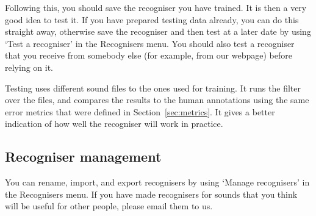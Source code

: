 \documentclass{article}
\begin{document}
Following this, you should save the recogniser you have trained. It is then a very good idea to test it. If you have prepared testing data already, you can do this straight away, otherwise save the recogniser and then test at a later date by using `Test a recogniser' in the Recognisers menu. You should also test a recogniser that you receive from somebody else (for example, from our webpage) before relying on it.

Testing uses different sound files to the ones used for training. It runs the filter over the files, and compares the results to the human annotations using the same error metrics that were defined in Section~\ref{sec:metrics}. It gives a better indication of how well the recogniser will work in practice. %

\subsection{Recogniser management}\label{sec:filters}

You can rename, import, and export recognisers by using `Manage recognisers' in the Recognisers menu. If you have made recognisers for sounds that you think will be useful for other people, please email them to us. 
   
\end{document}
